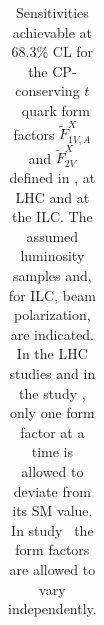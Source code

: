 \begin{table}[t]
\begin{center}
\begin{footnotesize}
\begin{tabular}{|cccc|}
\hline

\end{tabular}
\end{footnotesize}
\caption{Sensitivities achievable at $68.3\%$ CL for the
CP-conserving $t$~quark form factors $\widetilde F^X_{1V,A}$ and $\widetilde F^X_{2V}$ defined in , at LHC and at
the ILC.  The assumed luminosity samples and, for ILC, beam polarization,
 are indicated.
In the LHC studies and in the study
  \cite{Abe:2001nq}, only one form factor at a time is
allowed to deviate from its SM value.
In study~\cite{Amjad:2013hca} the form factors are allowed to vary independently. }
\label{tab:tab1}
\end{center}
\end{table}


